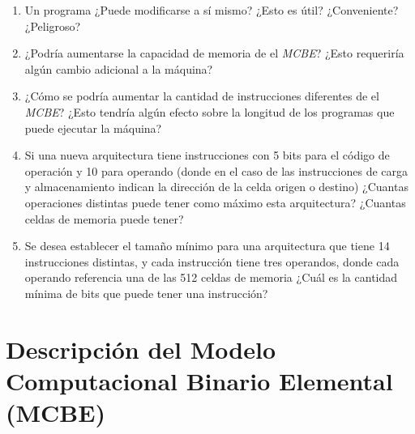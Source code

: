 \documentclass[12pt]{article}
\begin{document}
\begin{enumerate}
\begin{enumerate}
            \item Un programa ¿Puede modificarse a sí mismo? ¿Esto es útil?
                ¿Conveniente? ¿Peligroso?

            \item ¿Podría aumentarse la capacidad de memoria de el
                \emph{MCBE}? ¿Esto requeriría algún cambio adicional a la
                máquina?

            \item ¿Cómo se podría aumentar la cantidad de instrucciones
                diferentes de el \emph{MCBE}? ¿Esto tendría algún efecto sobre
                la longitud de los programas que puede ejecutar la máquina?

            \item Si una nueva arquitectura tiene instrucciones con 5 bits
                para el código de operación y 10 para operando (donde en el
                caso de las instrucciones de carga y almacenamiento indican la
                dirección de la celda origen o destino) ¿Cuantas operaciones
                distintas puede tener como máximo esta arquitectura? ¿Cuantas
                celdas de memoria puede tener?

            \item Se desea establecer el tamaño mínimo para una arquitectura
                que tiene 14 instrucciones distintas, y cada instrucción tiene
                tres operandos, donde cada operando referencia una de las 512
                celdas de memoria ¿Cuál es la cantidad mínima de bits que
                puede tener una instrucción?

        \end{enumerate}


\end{enumerate}

\appendix
\clearpage
\addappheadtotoc
\appendixpage

\section*{Descripción del Modelo Computacional Binario Elemental (MCBE)}
\end{document}
